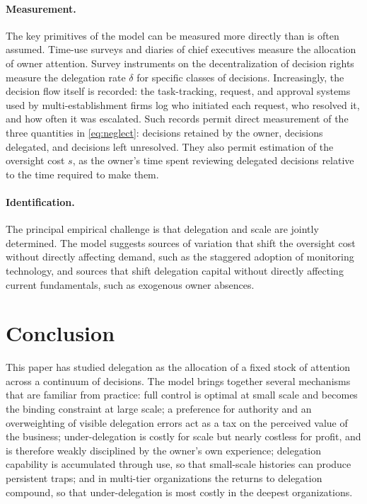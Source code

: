 \documentclass[11pt,a4paper]{article}
\theoremstyle{plain}
\begin{document}
\paragraph{Measurement.} The key primitives of the model can be measured more directly than is often assumed. Time-use surveys and diaries of chief executives \citep{bandiera2018,bandiera2020} measure the allocation of owner attention. Survey instruments on the decentralization of decision rights \citep{bloom2012} measure the delegation rate $\delta$ for specific classes of decisions. Increasingly, the decision flow itself is recorded: the task-tracking, request, and approval systems used by multi-establishment firms log who initiated each request, who resolved it, and how often it was escalated. Such records permit direct measurement of the three quantities in \eqref{eq:neglect}: decisions retained by the owner, decisions delegated, and decisions left unresolved. They also permit estimation of the oversight cost $s$, as the owner's time spent reviewing delegated decisions relative to the time required to make them.

\paragraph{Identification.} The principal empirical challenge is that delegation and scale are jointly determined. The model suggests sources of variation that shift the oversight cost without directly affecting demand, such as the staggered adoption of monitoring technology, and sources that shift delegation capital without directly affecting current fundamentals, such as exogenous owner absences.

\section{Conclusion}\label{sec:conclusion}

This paper has studied delegation as the allocation of a fixed stock of attention across a continuum of decisions. The model brings together several mechanisms that are familiar from practice: full control is optimal at small scale and becomes the binding constraint at large scale; a preference for authority and an overweighting of visible delegation errors act as a tax on the perceived value of the business; under-delegation is costly for scale but nearly costless for profit, and is therefore weakly disciplined by the owner's own experience; delegation capability is accumulated through use, so that small-scale histories can produce persistent traps; and in multi-tier organizations the returns to delegation compound, so that under-delegation is most costly in the deepest organizations.
\end{document}
